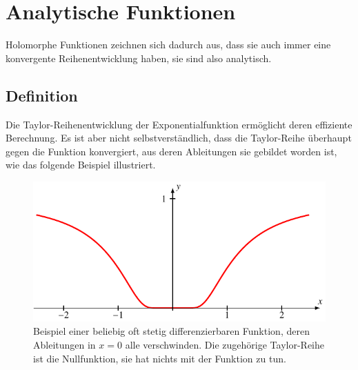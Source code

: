%
%
%
\section{Analytische Funktionen
\label{buch:funktionentheorie:section:analytisch}}
Holomorphe Funktionen zeichnen sich dadurch aus, dass sie auch immer
eine konvergente Reihenentwicklung haben, sie sind also analytisch.

%
%
\subsection{Definition}
%
%
Die Taylor-Reihenentwicklung der Exponentialfunktion ermöglicht deren
effiziente Berechnung.
Es ist aber nicht selbstverständlich, dass die Taylor-Reihe überhaupt
gegen die Funktion konvergiert, aus deren Ableitungen sie gebildet
worden ist, wie das folgende Beispiel illustriert.

\begin{figure}
\centering
\includegraphics{chapters/080-funktionentheorie/images/nonanalytic.pdf}
\caption{Beispiel einer beliebig oft stetig differenzierbaren Funktion,
deren Ableitungen in $x=0$ alle verschwinden.
Die zugehörige Taylor-Reihe ist die Nullfunktion, sie hat nichts mit der
Funktion zu tun.
\label{buch:funktionentheorie:fig:nonanalytic}}
\end{figure}

